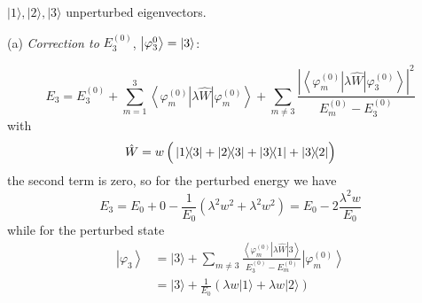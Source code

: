 \documentclass[12pt]{article}
\begin{document}
$|1\rangle,|2\rangle, |3\rangle$ unperturbed eigenvectors.

\medskip

(a) \emph{Correction to} $E_3^{(0)}$, $\ket{\varphi_3^{0}} = \ket{3}$:

\[
E_{3}=E_{3}^{(0)}+\sum_{m=1}^{3}\left\langle\varphi_{m}^{(0)}|\lambda \hat{W}| \varphi_{m}^{(0)}\right\rangle+\sum_{m \neq 3} \frac{\left|\left\langle\varphi_{m}^{(0)}|\lambda \hat{W}| \varphi_{3}^{(0)}\right\rangle\right|^{2}}{E_{m}^{(0)}-E_{3}^{(0)}}
\]
with
\[
\hat{W} = w\left(\Vstrut\op{1}{3} + \op{2}{3} + \op{3}{1} + \op{3}{2}\right)
\]
the second term is zero, so for the perturbed energy we have
\[
E_3=E_{0}+0-\frac{1}{E_{0}}\left(\lambda^{2} w^{2}+\lambda^{2} w^{2}\right)=E_{0}-2 \frac{\lambda^{2} w}{E_{0}}
\]
while for the perturbed state
\[
\begin{aligned}\left|\varphi_{3}\right\rangle 
& =|3\rangle+\sum_{m \neq 3} \frac{\left\langle\varphi_{m}^{(0)}|\lambda \hat{W}| 3\right\rangle}{E_{3}^{(0)}-E_{m}^{(0)}}\left|\varphi_{m}^{(0)}\right\rangle \\ 
& =|3\rangle+\frac{1}{E_{0}}(\lambda w|1\rangle+\lambda w|2\rangle) \\ 
\end{aligned}
\]

\medskip
\end{document}
